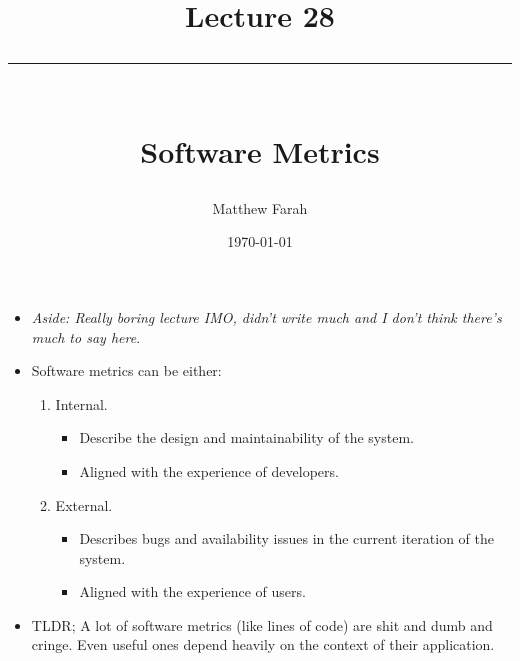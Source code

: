 \documentclass{article}
\date{
	\vspace{-.75em}
	{\large \today}
}
\title{
	\vspace*{-1.5em}
	{\Huge Lecture 28} \\
	\vspace{-1em}
	\rule{\textwidth/4}{.01em} \\
	\vspace{-.25em}
	{\Large Software Metrics}
	\vspace{-.75em}
}
\author{
	{\large Matthew Farah}
}
\begin{document}
\maketitle
\pagestyle{fancy}

\fi


\begin{itemize}
	\item \emph{Aside: Really boring lecture IMO, didn't write much and I don't think there's much to say here}.
	\item Software metrics can be either:
	\begin{enumerate}
		\item Internal.
		\begin{itemize}
			\item Describe the design and maintainability of the system.
			\item Aligned with the experience of developers.
		\end{itemize}
		\item External.
		\begin{itemize}
			\item Describes bugs and availability issues in the current iteration of the system.
			\item Aligned with the experience of users.
		\end{itemize}
	\end{enumerate}
	\item TLDR; A lot of software metrics (like lines of code) are shit and dumb and cringe. Even useful ones depend heavily on the context of their application.
\end{itemize}

\ifdefined\iscombined
	\newpage
\else
	
\end{document}
